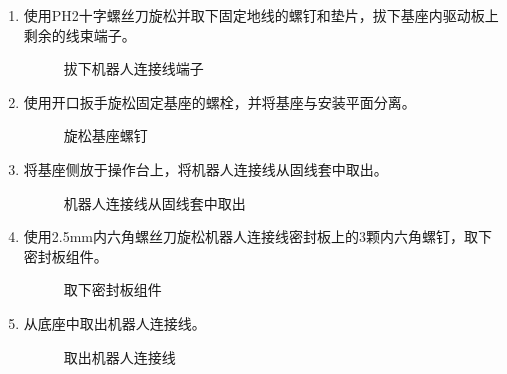 \documentclass[a4paper,11pt,english,openany,oneside]{sphinxmanual}
\begin{document}
\begin{enumerate}
\item {} 
\sphinxAtStartPar
使用PH2十字螺丝刀旋松并取下固定地线的螺钉和垫片，拔下基座内驱动板上剩余的线束端子。

\begin{figure}[H]
\centering
\capstart

\noindent{}
\caption{拔下机器人连接线端子}\label{\detokenize{_u66f4_u6362_u57fa_u5ea7:id13}}\end{figure}

\item {} 
\sphinxAtStartPar
使用开口扳手旋松固定基座的螺栓，并将基座与安装平面分离。

\begin{figure}[H]
\centering
\capstart

\noindent{}
\caption{旋松基座螺钉}\label{\detokenize{_u66f4_u6362_u57fa_u5ea7:id14}}\end{figure}

\item {} 
\sphinxAtStartPar
将基座侧放于操作台上，将机器人连接线从固线套中取出。

\begin{figure}[H]
\centering
\capstart

\noindent{}
\caption{机器人连接线从固线套中取出}\label{\detokenize{_u66f4_u6362_u57fa_u5ea7:id15}}\end{figure}

\item {} 
\sphinxAtStartPar
使用2.5mm内六角螺丝刀旋松机器人连接线密封板上的3颗内六角螺钉，取下密封板组件。

\begin{figure}[H]
\centering
\capstart

\noindent{}
\caption{取下密封板组件}\label{\detokenize{_u66f4_u6362_u57fa_u5ea7:id16}}\end{figure}

\item {} 
\sphinxAtStartPar
从底座中取出机器人连接线。

\begin{figure}[H]
\centering
\capstart

\noindent{}
\caption{取出机器人连接线}\label{\detokenize{_u66f4_u6362_u57fa_u5ea7:id17}}\end{figure}

\end{enumerate}
\end{document}
